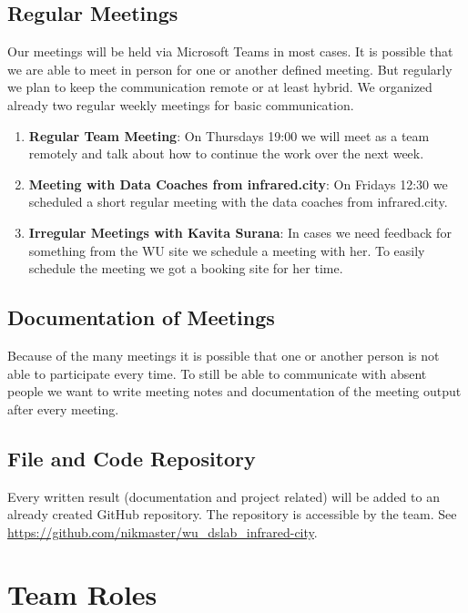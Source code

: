 \documentclass[12pt]{article}
\begin{document}
\subsection{Regular Meetings}

Our meetings will be held via Microsoft Teams in most cases. It is possible that we are able to meet in person for one or another defined meeting. But regularly we plan to keep the communication remote or at least hybrid. We organized already two regular weekly meetings for basic communication.

\begin{enumerate}
    \item \textbf{Regular Team Meeting}: On Thursdays 19:00 we will meet as a team remotely and talk about how to continue the work over the next week.
    \item \textbf{Meeting with Data Coaches from infrared.city}: On Fridays 12:30 we scheduled a short regular meeting with the data coaches from infrared.city.
    \item \textbf{Irregular Meetings with Kavita Surana}: In cases we need feedback for something from the WU site we schedule a meeting with her. To easily schedule the meeting we got a booking site for her time.
\end{enumerate}

\subsection{Documentation of Meetings}

Because of the many meetings it is possible that one or another person is not able to participate every time. To still be able to communicate with absent people we want to write meeting notes and documentation of the meeting output after every meeting.

\subsection{File and Code Repository}

Every written result (documentation and project related) will be added to an already created GitHub repository. The repository is accessible by the team. See \url{https://github.com/nikmaster/wu_dslab_infrared-city}.


\section{Team Roles}
\end{document}
